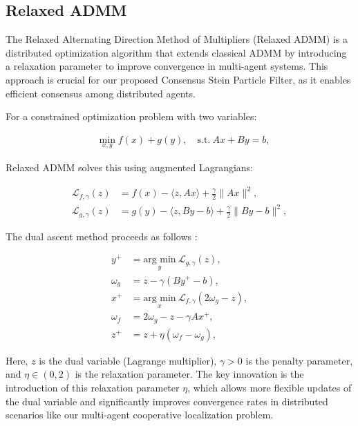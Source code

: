 \documentclass[a4paper,fleqn,10pt,twocolumn]{SICE_ISCS}
\begin{document}
\subsection{Relaxed ADMM}

The Relaxed Alternating Direction Method of Multipliers (Relaxed ADMM) is a distributed optimization algorithm that extends classical ADMM by introducing a relaxation parameter to improve convergence in multi-agent systems. This approach is crucial for our proposed Consensus Stein Particle Filter, as it enables efficient consensus among distributed agents.

For a constrained optimization problem with two variables:

\begin{equation}
\begin{aligned}\label{eq:constrained_opt}
&\min_{x,y} f(x)+g(y), \quad \text{s.t.}\: Ax+By=b,
\end{aligned}
\end{equation}

Relaxed ADMM solves this using augmented Lagrangians:

\begin{equation}
\begin{aligned}\label{eq:augmented_lagrangian}
{\mathcal{ L}}_{f,\gamma}(z) &= f(x) - \langle z, Ax \rangle + \frac \gamma 2 \|Ax\|^2,\\
{\mathcal{ L}}_{g,\gamma}(z) &=  g(y) - \langle z, By-b \rangle + \frac \gamma 2 \|By-b\|^2,
\end{aligned}
\end{equation}

The dual ascent method proceeds as follows \cite{Peng2016}\cite{Boyd2011}:

\begin{equation}
\begin{aligned}\label{eq:relaxed_admm_steps}
y^+&= \underset{y}{\text{arg min}}\: {\mathcal{ L}}_{g,\gamma}(z),\\
\omega_g &=  z - \gamma (By^+-b), \\
x^+&= \underset{x}{\text{arg min}}\: {\mathcal{ L}}_{f,\gamma}(2\omega_g - z),\\
\omega_f &= 2\omega_g - z - \gamma Ax^+,\\
z^+&=z+\eta(\omega_f-\omega_g),
\end{aligned}
\end{equation}

Here, $z$ is the dual variable (Lagrange multiplier), $\gamma > 0$ is the penalty parameter, and $\eta \in (0,2)$ is the relaxation parameter. The key innovation is the introduction of this relaxation parameter $\eta$, which allows more flexible updates of the dual variable and significantly improves convergence rates in distributed scenarios like our multi-agent cooperative localization problem.
\end{document}
